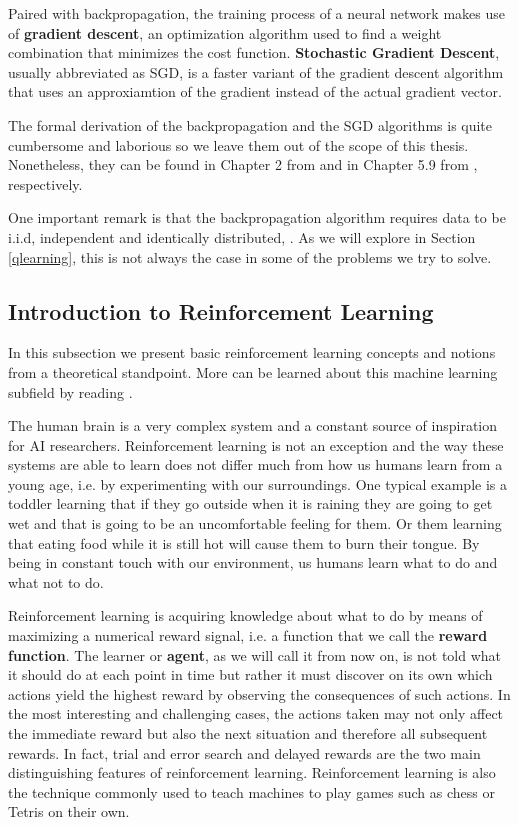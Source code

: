 \documentclass[11pt]{article}
\theoremstyle{definition}
\begin{document}
Paired with backpropagation, the training process of a neural network makes use of \textbf{gradient descent}, an optimization algorithm used to find a weight combination that minimizes the cost function. \textbf{Stochastic Gradient Descent}, usually abbreviated as SGD, is a faster variant of the gradient descent algorithm that uses an approxiamtion of the gradient instead of the actual gradient vector. 

The formal derivation of the backpropagation and the SGD algorithms is quite  cumbersome and laborious so we leave them out of the scope of this thesis. Nonetheless, they can be found in Chapter 2 from \cite{nielsen} and in Chapter 5.9 from \cite{goodfellow}, respectively. 

One important remark is that the backpropagation algorithm requires data to be i.i.d, independent and identically distributed, \cite{dundar}. As we will explore in Section \ref{qlearning}, this is not always the case in some of the problems we try to solve.

\subsection{Introduction to Reinforcement Learning}  \label{reinforcement}

In this subsection we present basic reinforcement learning concepts and notions from a theoretical standpoint. More can be learned about this machine learning subfield by reading \cite{SuttonBarto, franccois2018introduction}.

The human brain is a very complex system and a constant source of inspiration for AI researchers. Reinforcement learning is not an exception and the way these systems are able to learn does not differ much from how us humans learn from a young age, i.e. by experimenting with our surroundings. One typical example is a toddler learning that if they go outside when it is raining they are going to get wet and that is going to be an uncomfortable feeling for them. Or them learning that eating food while it is still hot will cause them to burn their tongue. By being in constant touch with our environment, us humans learn what to do and what not to do. 

Reinforcement learning is acquiring knowledge about what to do by means of maximizing a numerical reward signal, i.e. a function that we call the \textbf{reward function}. The learner or \textbf{agent}, as we will call it from now on, is not told what it should do at each point in time but rather it must discover on its own which actions yield the highest reward by observing the consequences of such actions. In the most interesting and challenging cases, the actions taken may not only affect the immediate reward but also the next situation and therefore all subsequent rewards. In fact, trial and error search and delayed rewards are the two main distinguishing features of reinforcement learning. Reinforcement learning is also the technique commonly used to teach machines to play games such as chess or Tetris on their own. 
\end{document}
